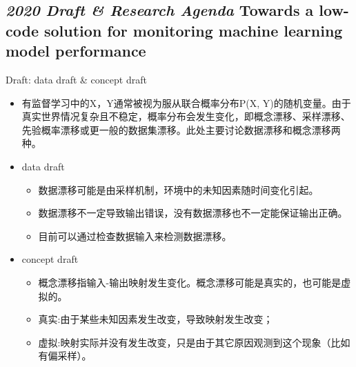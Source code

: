 \documentclass{beamer}
\begin{document}
\subsection{\textit{2020 Draft \& Research Agenda} Towards a low-code solution for monitoring machine learning model performance}
\begin{frame}{Draft: data draft \& concept draft}
    \begin{itemize}
        \item 有监督学习中的X，Y通常被视为服从联合概率分布P(X, Y)的随机变量。由于真实世界情况复杂且不稳定，概率分布会发生变化，即概念漂移、采样漂移、先验概率漂移或更一般的数据集漂移。此处主要讨论数据漂移和概念漂移两种。
        \item data draft
        \begin{itemize}
            \item 数据漂移可能是由采样机制，环境中的未知因素随时间变化引起。
            \item 数据漂移不一定导致输出错误，没有数据漂移也不一定能保证输出正确。
            \item 目前可以通过检查数据输入来检测数据漂移。
        \end{itemize}
        \item concept draft
        \begin{itemize}
            \item 概念漂移指输入-输出映射发生变化。概念漂移可能是真实的，也可能是虚拟的。
            \item 真实:由于某些未知因素发生改变，导致映射发生改变；
            \item 虚拟:映射实际并没有发生改变，只是由于其它原因观测到这个现象（比如有偏采样）。
        \end{itemize}
    \end{itemize}
\end{frame}
\end{document}
